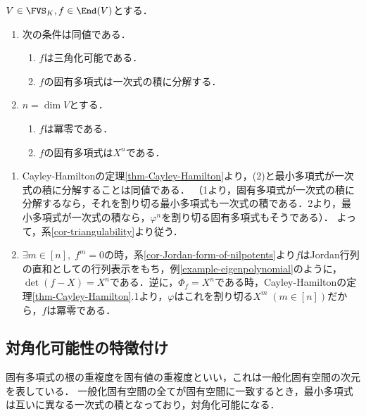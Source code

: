 \documentclass[uplatex, dvipdfmx]{jsreport}
\begin{document}
\begin{corollary}[最小多項式の代用]
    $V\in\FVS_K,f\in\End(V)$とする．
    \begin{enumerate}
        \item 次の条件は同値である．\begin{enumerate}[(1)]
            \item $f$は三角化可能である．
            \item $f$の固有多項式は一次式の積に分解する．
        \end{enumerate}
        \item $n=\dim V$とする．\begin{enumerate}
            \item $f$は冪零である．
            \item $f$の固有多項式は$X^n$である．
        \end{enumerate}
    \end{enumerate}
\end{corollary}
\begin{Proof}\mbox{}
    \begin{enumerate}
        \item Cayley-Hamiltonの定理\ref{thm-Cayley-Hamilton}より，(2)と最小多項式が一次式の積に分解することは同値である．
        （1より，固有多項式が一次式の積に分解するなら，それを割り切る最小多項式も一次式の積である．2より，最小多項式が一次式の積なら，$\varphi^n$を割り切る固有多項式もそうである）．
        よって，系\ref{cor-triangulability}より従う．
        \item $\exists m\in[n],\;f^m=0$の時，系\ref{cor-Jordan-form-of-nilpotents}より$f$はJordan行列の直和としての行列表示をもち，例\ref{example-eigenpolynomial}のように，
        $\det(f-X)=X^n$である．逆に，$\Phi_f=X^n$である時，Cayley-Hamiltonの定理\ref{thm-Cayley-Hamilton}.1より，$\varphi$はこれを割り切る$X^m\;(m\in[n])$だから，$f$は冪零である．
    \end{enumerate}
\end{Proof}

\subsection{対角化可能性の特徴付け}

\begin{tcolorbox}[colframe=ForestGreen, colback=ForestGreen!10!white,breakable,colbacktitle=ForestGreen!40!white,coltitle=black,fonttitle=\bfseries\sffamily,
title=]
    固有多項式の根の重複度を固有値の重複度といい，これは一般化固有空間の次元を表している．
    一般化固有空間の全てが固有空間に一致するとき，最小多項式は互いに異なる一次式の積となっており，対角化可能になる．
\end{tcolorbox}
\end{document}
